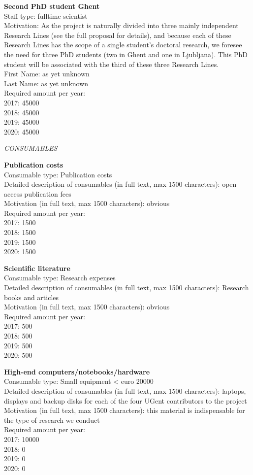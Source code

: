 \documentclass[11pt,dvipsnames,usenames,a4paper]{article}
\begin{document}
{\bf Second PhD student Ghent}\\
Staff type: fulltime scientist\\
Motivation: As the project is naturally divided into three mainly independent Research Lines (see the full proposal for details), and because each of these Research Lines has the scope of a single student's doctoral research, we foresee the need for three PhD students (two in Ghent and one in Ljubljana). This PhD student will be associated with the third of these three Research Lines.\\
First Name: as yet unknown\\
Last Name: as yet unknown\\
Required amount per year:\\
2017: 45000\\
2018: 45000\\
2019: 45000\\
2020: 45000

{\it CONSUMABLES}

{\bf Publication costs}\\
Consumable type: Publication costs\\
Detailed description of consumables (in full text, max 1500 characters): open access publication fees\\
Motivation (in full text, max 1500 characters): obvious\\
Required amount per year:\\
2017: 1500\\
2018: 1500\\
2019: 1500\\
2020: 1500

{\bf Scientific literature}\\
Consumable type: Research expenses\\
Detailed description of consumables (in full text, max 1500 characters): Research books and articles\\
Motivation (in full text, max 1500 characters): obvious\\
Required amount per year:\\
2017: 500\\
2018: 500\\
2019: 500\\
2020: 500


{\bf High-end computers/notebooks/hardware}\\
Consumable type: Small equipment < euro 20000\\
Detailed description of consumables (in full text, max 1500 characters): laptops, displays and backup disks for each of the four UGent contributors to the project\\
Motivation (in full text, max 1500 characters): this material is indispensable for the type of research we conduct\\
Required amount per year:\\
2017: 10000\\
2018: 0\\
2019: 0\\
2020: 0
\end{document}
